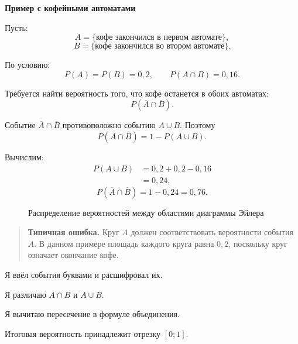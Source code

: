 \documentclass[a4paper,12pt]{article}
\newcommand{\subtopic}[1]{%
  \par\medskip
  {\large\bfseries\color{darkaccent}#1\par}
  \vspace{0.2em}
}
\newcommand{\warning}[1]{%
  \begin{quote}
    \color{darkaccent}\textbf{Типичная ошибка.}\;
    \color{textgray}#1
  \end{quote}
}
\begin{document}
\subtopic{Пример с кофейными автоматами}

Пусть:
\[
A=\{\text{кофе закончился в первом автомате}\},
\]
\[
B=\{\text{кофе закончился во втором автомате}\}.
\]

По условию:
\[
P(A)=P(B)=0,2,
\qquad
P(A\cap B)=0,16.
\]

Требуется найти вероятность того, что кофе останется в обоих
автоматах:
\[
P(\overline A\cap\overline B).
\]

Событие \(\overline A\cap\overline B\) противоположно событию
\(A\cup B\). Поэтому
\[
P(\overline A\cap\overline B)
=
1-P(A\cup B).
\]

Вычислим:
\[
\begin{aligned}
P(A\cup B)
&=
0,2+0,2-0,16\\
&=
0,24,
\end{aligned}
\]
\[
P(\overline A\cap\overline B)
=
1-0,24
=
0,76.
\]

\begin{figure}[htbp]
  \centering
  \caption{Распределение вероятностей между областями диаграммы Эйлера}
\end{figure}

\warning{Круг \(A\) должен соответствовать вероятности события \(A\). В данном примере площадь каждого круга равна \(0,2\), поскольку круг означает окончание кофе.}

\begin{checklist}
  \item Я ввёл события буквами и расшифровал их.
  \item Я различаю \(A\cap B\) и \(A\cup B\).
  \item Я вычитаю пересечение в формуле объединения.
  \item Итоговая вероятность принадлежит отрезку \([0;1]\).
\end{checklist}
\end{document}

